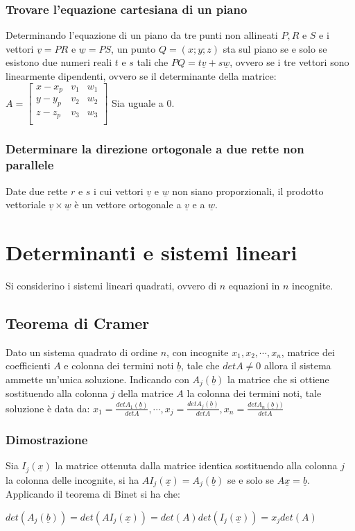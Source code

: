 \subsubsection{Trovare l'equazione cartesiana di un piano}
Determinando l'equazione di un piano da tre punti non allineati $P, R$ e $S$ e i vettori $\underline{v}=PR$ e $\underline{w}=PS$, un punto $Q=(x;y;z)$ sta sul piano se e 
solo se esistono due numeri reali $t$ e $s$ tali che $PQ=t\underline{v}+s\underline{w}$, ovvero se i tre vettori sono linearmente dipendenti, ovvero se il determinante della
matrice: $A=
\left[\begin{matrix}
x-x_p & v_1 & w_1 \\
y-y_p & v_2 & w_2 \\
z-z_p & v_3 & w_3 \\
\end{matrix}\right]$
Sia uguale a $0$.
\subsubsection{Determinare la direzione ortogonale a due rette non parallele}
Date due rette $r$ e $s$ i cui vettori $\underline{v}$ e $\underline{w}$ non siano proporzionali, il prodotto vettoriale $\underline{v}\times\underline{w}$ \`e un vettore
ortogonale a $\underline{v}$ e a $\underline{w}$.
\section{Determinanti e sistemi lineari}
Si considerino i sistemi lineari quadrati, ovvero di $n$ equazioni in $n$ incognite.
\subsection{Teorema di Cramer}
Dato un sistema quadrato di ordine $n$, con incognite $x_1, x_2, \cdots, x_n$, matrice dei coefficienti $A$ e colonna dei termini noti $\underline{b}$, tale che $detA\neq 0$
allora il sistema ammette un'unica soluzione. Indicando con $A_j(\underline{b})$ la matrice che si ottiene sostituendo alla colonna $j$ della matrice $A$ la colonna dei 
termini noti, tale soluzione \`e data da: $x_1=\frac{detA_1(\underline{b})}{detA},\cdots, x_j=\frac{detA_j(\underline{b})}{detA}, x_n=\frac{detA_n(\underline{b}))}{detA}$
\subsubsection{Dimostrazione}
Sia $I_j(\underline{x})$ la matrice ottenuta dalla matrice identica sostituendo alla colonna $j$ la colonna delle incognite, si ha $AI_j(\underline{x})=A_j(\underline{b})$ se 
e solo se $A\underline{x}=\underline{b}$. Applicando il teorema di Binet si ha che:
\begin{center}
$det(A_j(\underline{b}))=det(AI_j(\underline{x}))=det(A)det(I_j(\underline{x}))=x_jdet(A)$
\end{center}
